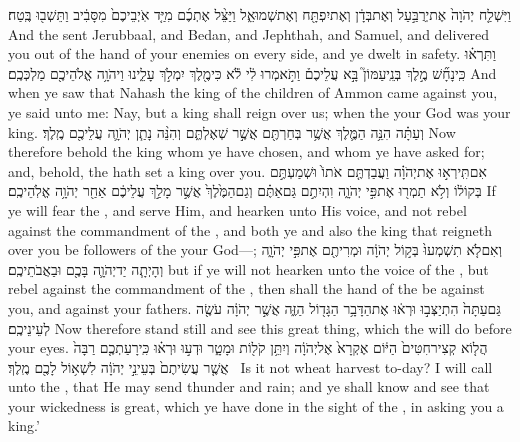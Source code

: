 {וַיִּשְׁלַ֤ח יְהֹוָה֙ אֶת\maqqaf יְרֻבַּ֣עַל וְאֶת\maqqaf בְּדָ֔ן וְאֶת\maqqaf יִפְתָּ֖ח וְאֶת\maqqaf שְׁמוּאֵ֑ל וַיַּצֵּ֨ל אֶתְכֶ֜ם מִיַּ֤ד אֹֽיְבֵיכֶם֙ מִסָּבִ֔יב וַתֵּשְׁב֖וּ בֶּֽטַח׃}
{And the \lord\space sent Jerubbaal, and Bedan, and Jephthah, and Samuel, and delivered you out of the hand of your enemies on every side, and ye dwelt in safety.}
{וַתִּרְא֗וּ כִּֽי\maqqaf נָחָ֞שׁ מֶ֣לֶךְ בְּנֵֽי\maqqaf עַמּוֹן֮ בָּ֣א עֲלֵיכֶם֒ וַתֹּ֣אמְרוּ לִ֔י לֹ֕א כִּי\maqqaf מֶ֖לֶךְ יִמְלֹ֣ךְ עָלֵ֑ינוּ וַיהֹוָ֥ה אֱלֹהֵיכֶ֖ם מַלְכְּכֶֽם׃}
{And when ye saw that Nahash the king of the children of Ammon came against you, ye said unto me: Nay, but a king shall reign over us; when the \lord\space your God was your king.}
{וְעַתָּ֗ה הִנֵּ֥ה הַמֶּ֛לֶךְ אֲשֶׁ֥ר בְּחַרְתֶּ֖ם אֲשֶׁ֣ר שְׁאֶלְתֶּ֑ם וְהִנֵּ֨ה נָתַ֧ן יְהֹוָ֛ה עֲלֵיכֶ֖ם מֶֽלֶךְ׃}
{Now therefore behold the king whom ye have chosen, and whom ye have asked for; and, behold, the \lord\space hath set a king over you.}
{אִם\maqqaf תִּֽירְא֣וּ אֶת\maqqaf יְהֹוָ֗ה וַעֲבַדְתֶּ֤ם אֹתוֹ֙ וּשְׁמַעְתֶּ֣ם בְּקוֹל֔וֹ וְלֹ֥א תַמְר֖וּ אֶת\maqqaf פִּ֣י יְהֹוָ֑ה וִהְיִתֶ֣ם גַּם\maqqaf אַתֶּ֗ם וְגַם\maqqaf הַמֶּ֙לֶךְ֙ אֲשֶׁ֣ר מָלַ֣ךְ עֲלֵיכֶ֔ם אַחַ֖ר יְהֹוָ֥ה אֱלֹֽהֵיכֶֽם׃}
{If ye will fear the \lord, and serve Him, and hearken unto His voice, and not rebel against the commandment of the \lord, and both ye and also the king that reigneth over you be followers of the \lord\space your God—;}
{וְאִם\maqqaf לֹ֤א תִשְׁמְעוּ֙ בְּק֣וֹל יְהֹוָ֔ה וּמְרִיתֶ֖ם אֶת\maqqaf פִּ֣י יְהֹוָ֑ה וְהָיְתָ֧ה יַד\maqqaf יְהֹוָ֛ה בָּכֶ֖ם וּבַאֲבֹתֵיכֶֽם׃}
{but if ye will not hearken unto the voice of the \lord, but rebel against the commandment of the \lord, then shall the hand of the \lord\space be against you, and against your fathers.}
{גַּם\maqqaf עַתָּה֙ הִתְיַצְּב֣וּ וּרְא֔וּ אֶת\maqqaf הַדָּבָ֥ר הַגָּד֖וֹל הַזֶּ֑ה אֲשֶׁ֣ר יְהֹוָ֔ה עֹשֶׂ֖ה לְעֵינֵיכֶֽם׃}
{Now therefore stand still and see this great thing, which the \lord\space will do before your eyes.}
{הֲל֤וֹא קְצִיר\maqqaf חִטִּים֙ הַיּ֔וֹם אֶקְרָא֙ אֶל\maqqaf יְהֹוָ֔ה וְיִתֵּ֥ן קֹל֖וֹת וּמָטָ֑ר וּדְע֣וּ וּרְא֗וּ כִּֽי\maqqaf רָעַתְכֶ֤ם רַבָּה֙ אֲשֶׁ֤ר עֲשִׂיתֶם֙ בְּעֵינֵ֣י יְהֹוָ֔ה לִשְׁא֥וֹל לָכֶ֖ם מֶֽלֶךְ׃ \setuma }
{Is it not wheat harvest to-day? I will call unto the \lord, that He may send thunder and rain; and ye shall know and see that your wickedness is great, which ye have done in the sight of the \lord, in asking you a king.’}
